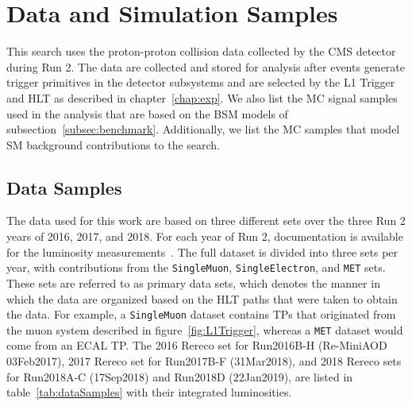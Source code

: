 
\section{Data and Simulation Samples}
\label{sec:samples}

This search uses the proton-proton collision data collected by the CMS detector during Run 2.
The data are collected and stored for analysis after events generate trigger primitives in the detector subsystems and are selected by the L1 Trigger and HLT as described in chapter~\ref{chap:exp}.
We also list the MC signal samples used in the analysis that are based on the BSM models of subsection~\ref{subsec:benchmark}.
Additionally, we list the MC samples that model SM background contributions to the search.

\subsection{Data Samples}

The data used for this work are based on three different sets over the three Run 2 years of 2016, 2017, and 2018.
For each year of Run 2, documentation is available for the luminosity measurements~\cite{CMS-PAS-LUM-17-001,CMS-PAS-LUM-17-004,CMS-PAS-LUM-18-002}.
The full dataset is divided into three sets per year, with contributions from the \texttt{SingleMuon}, \texttt{SingleElectron}, and \texttt{MET} sets.
These sets are referred to as primary data sets, which denotes the manner in which the data are organized based on the HLT paths that were taken to obtain the data. %
For example, a \texttt{SingleMuon} dataset contains TPs that originated from the muon system described in figure~\ref{fig:L1Trigger}, whereas a \texttt{MET} dataset would come from an ECAL TP.
The 2016 Rereco set for Run2016B-H (Re-MiniAOD 03Feb2017), 2017 Rereco set for Run2017B-F (31Mar2018), and 2018 Rereco sets for Run2018A-C (17Sep2018) and Run2018D (22Jan2019), are listed in table~\ref{tab:dataSamples} with their integrated luminosities.


